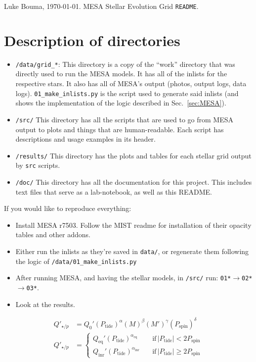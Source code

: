 \documentclass{article}
\begin{document}
\noindent Luke Bouma, \today. MESA Stellar Evolution Grid \texttt{README}.

\section{Description of directories}
\begin{itemize}
	\item \texttt{/data/grid\_*}: This directory is a copy of the ``work'' 
	directory that was directly used to run the MESA models. It has all of the 
	inlists for the respective stars. It also has all of MESA's output (photos, 
	output logs, data logs).
	\texttt{01\_make\_inlists.py} is the script used to generate said inlists 
	(and shows the implementation of the logic described in 
	Sec.~\ref{sec:MESA}).
	
	\item \texttt{/src/} This directory has all the scripts that are used to 
	go from MESA output to plots and things that are human-readable.
	Each script has descriptions and usage examples in its header. 
	
	\item \texttt{/results/} This directory has the plots and tables for each 
	stellar grid output by \texttt{src} scripts.
	
	\item \texttt{/doc/} This directory has all the documentation for this 
	project. This includes text files that serve as a lab-notebook, as well as 
	this README.
\end{itemize}

If you would like to reproduce everything:
\begin{itemize}
	\item Install MESA r7503. Follow the MIST readme for installation of their 
	opacity tables and other addons.
	\item Either run the inlists as they're saved in \texttt{data/}, or 
	regenerate them following the logic of \texttt{/data/01\_make\_inlists.py}
	\item After running MESA, and having the stellar models, in \texttt{/src/} 
	run: \texttt{01*}$\rightarrow$\texttt{02*}$\rightarrow$\texttt{03*}.
	\item Look at the results.
\end{itemize}

\begin{align}
Q'_{\star/p} &= Q_0' (P_\mathrm{tide})^\alpha (M)^\beta (M')^\gamma 
(P_\mathrm{spin})^\delta
\label{eq:dissipation_model} \\
Q'_{\star/p} &= 
\begin{cases}
Q_\mathrm{eq}' (P_\mathrm{tide})^{\alpha_\mathrm{eq}} \quad 
&\mathrm{if}\,|P_\mathrm{tide}|<2P_\mathrm{spin}\\
Q_\mathrm{inr}' (P_\mathrm{tide})^{\alpha_\mathrm{inr}} \quad 
&\mathrm{if}\,|P_\mathrm{tide}|\geq2 P_\mathrm{spin}
\end{cases}
\end{align}
\end{document}
